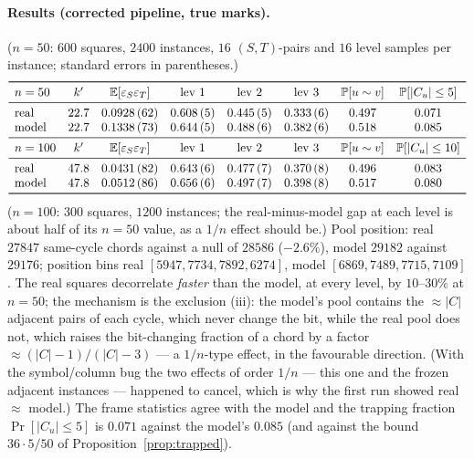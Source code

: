 \paragraph{Results (corrected pipeline, true marks).}  ($n=50$: $600$
squares, $2400$ instances, $16$ $(S,T)$-pairs and $16$ level samples
per instance; standard errors in parentheses.)
\[
\begin{array}{lccccccc}
\toprule
n=50 & k' & \E[\varepsilon_S\varepsilon_T] & \text{lev }1 & \text{lev }2 & \text{lev }3 & \Pr[u\sim v] & \Pr[|C_u|\le5]\\
\midrule
\text{real}  & 22.7 & 0.0928\,(62) & 0.608\,(5) & 0.445\,(5) & 0.333\,(6) & 0.497 & 0.071\\
\text{model} & 22.7 & 0.1338\,(73) & 0.644\,(5) & 0.488\,(6) & 0.382\,(6) & 0.518 & 0.085\\
\midrule
n=100 & k' & \E[\varepsilon_S\varepsilon_T] & \text{lev }1 & \text{lev }2 & \text{lev }3 & \Pr[u\sim v] & \Pr[|C_u|\le10]\\
\midrule
\text{real}  & 47.8 & 0.0431\,(82) & 0.643\,(6) & 0.477\,(7) & 0.370\,(8) & 0.496 & 0.083\\
\text{model} & 47.8 & 0.0512\,(86) & 0.656\,(6) & 0.497\,(7) & 0.398\,(8) & 0.517 & 0.080\\
\bottomrule
\end{array}
\]
($n=100$: $300$ squares, $1200$ instances; the real-minus-model gap at
each level is about half of its $n=50$ value, as a $1/n$ effect should be.)  Pool position: real
$27847$ same-cycle chords against a null of $28586$ ($-2.6\%$), model
$29182$ against $29176$; position bins real $[5947,7734,7892,6274]$,
model $[6869,7489,7715,7109]$.  The real squares decorrelate
\emph{faster} than the model, at every level, by $10$--$30\%$ at
$n=50$; the mechanism is the exclusion (iii): the model's pool
contains the $\approx|C|$ adjacent pairs of each cycle, which never
change the bit, while the real pool does not, which raises the
bit-changing fraction of a chord by a factor $\approx(|C|-1)/(|C|-3)$
--- a $1/n$-type effect, in the favourable direction.  (With the
symbol/column bug the two effects of order $1/n$ --- this one and the
frozen adjacent instances --- happened to cancel, which is why the
first run showed real $\approx$ model.)  The frame statistics agree
with the model and the trapping fraction $\Pr[|C_u|\le5]$ is $0.071$
against the model's $0.085$ (and against the bound $36\cdot5/50$ of
Proposition~\ref{prop:trapped}).

